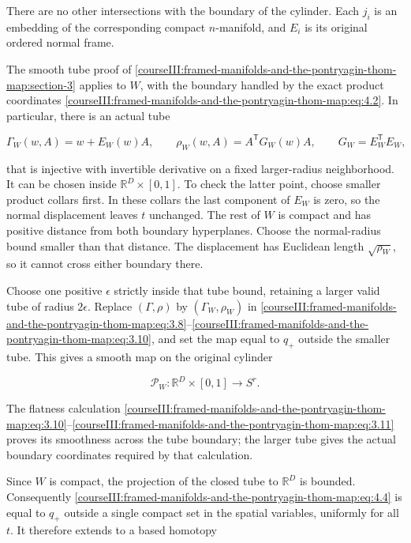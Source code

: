 There are no other intersections with the boundary of the cylinder. Each \(j_i\) is an embedding of the corresponding compact \(n\)-manifold, and \(E_i\) is its original ordered normal frame.

The smooth tube proof of \cref{courseIII:framed-manifolds-and-the-pontryagin-thom-map:section-3} applies to \(W\), with the boundary handled by the exact product coordinates \eqref{courseIII:framed-manifolds-and-the-pontryagin-thom-map:eq:4.2}. In particular, there is an actual tube

\begin{equation}
\Gamma_W(w,A)=w+E_W(w)A,\qquad
 \rho_W(w,A)=A^{\mathsf T}G_W(w)A,\qquad
 G_W=E_W^{\mathsf T}E_W,
 \label{courseIII:framed-manifolds-and-the-pontryagin-thom-map:eq:4.3}
\end{equation}

that is injective with invertible derivative on a fixed larger-radius neighborhood. It can be chosen inside \(\mathbb R^D\times[0,1]\). To check the latter point, choose smaller product collars first. In these collars the last component of \(E_W\) is zero, so the normal displacement leaves \(t\) unchanged. The rest of \(W\) is compact and has positive distance from both boundary hyperplanes. Choose the normal-radius bound smaller than that distance. The displacement has Euclidean length \(\sqrt{\rho_W}\), so it cannot cross either boundary there.

Choose one positive \(\epsilon\) strictly inside that tube bound, retaining a larger valid tube of radius \(2\epsilon\). Replace \((\Gamma,\rho)\) by \((\Gamma_W,\rho_W)\) in \eqref{courseIII:framed-manifolds-and-the-pontryagin-thom-map:eq:3.8}--\eqref{courseIII:framed-manifolds-and-the-pontryagin-thom-map:eq:3.10}, and set the map equal to \(q_+\) outside the smaller tube. This gives a smooth map on the original cylinder

\begin{equation}
\mathcal P_W:\mathbb R^D\times[0,1]\longrightarrow S^r.
 \label{courseIII:framed-manifolds-and-the-pontryagin-thom-map:eq:4.4}
\end{equation}

The flatness calculation \eqref{courseIII:framed-manifolds-and-the-pontryagin-thom-map:eq:3.10}--\eqref{courseIII:framed-manifolds-and-the-pontryagin-thom-map:eq:3.11} proves its smoothness across the tube boundary; the larger tube gives the actual boundary coordinates required by that calculation.

Since \(W\) is compact, the projection of the closed tube to \(\mathbb R^D\) is bounded. Consequently \eqref{courseIII:framed-manifolds-and-the-pontryagin-thom-map:eq:4.4} is equal to \(q_+\) outside a single compact set in the spatial variables, uniformly for all \(t\). It therefore extends to a based homotopy

